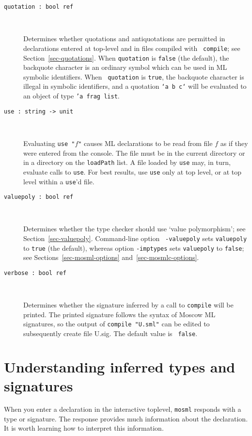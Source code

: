 \documentclass[fleqn,a4paper]{article}
\begin{document}
\begin{description}
\item[{\tt quotation :\ bool ref}]\mbox{ }

  Determines whether quotations and antiquotations are permitted in
  declarations entered at top-level and in files compiled with {\tt
    compile}; see Section~\ref{sec-quotations}.  When {\tt quotation}
  is {\tt false} (the default), the backquote character is an ordinary
  symbol which can be used in ML symbolic identifiers.  When {\tt
    quotation} is {\tt true}, the backquote character is illegal in
  symbolic identifiers, and a quotation {\tt `a b c`} will be
  evaluated to an object of type {\tt 'a frag list}.

\item[{\tt use :\ string -> unit}]\mbox{ }

  Evaluating {\tt use "$f$"} causes ML declarations to be read from
  file $f$ as if they were entered from the console.  The file must be
  in the current directory or in a directory on the {\tt loadPath}
  list.  A file loaded by {\tt use} may, in turn, evaluate calls to
  {\tt use}.  For best results, use {\tt use} only at top level, or at
  top level within a {\tt use}'d file.

\item[{\tt valuepoly :\ bool ref}]\mbox{ }

  Determines whether the type checker should use `value polymorphism';
  see Section~\ref{sec-valuepoly}.  Command-line option {\tt
    -valuepoly} sets {\tt valuepoly} to {\tt true} (the default),
  whereas option {\tt -imptypes} sets {\tt valuepoly} to {\tt false};
  see Sections~\ref{sec-mosml-options} and~\ref{sec-mosmlc-options}.

\item[{\tt verbose :\ bool ref}]\mbox{ }

  Determines whether the signature inferred by a call to {\tt compile}
  will be printed.  The printed signature follows the syntax of Moscow
  ML signatures, so the output of {\tt compile "{\rm U.sml}"} can be
  edited to subsequently create file U.sig.  The default value is {\tt
    false}.
\end{description}


\newpage

\section{Understanding inferred types and signatures}

When you enter a declaration in the interactive toplevel,
\texttt{mosml} responds with a type or signature.  The response
provides much information about the declaration.  It is worth learning
how to interpret this information.
\end{document}
